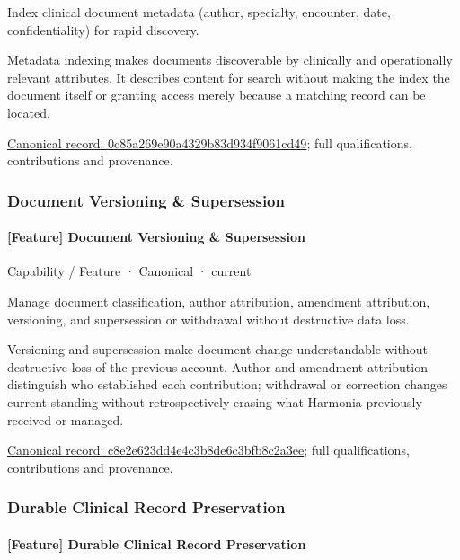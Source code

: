 Index clinical document metadata (author, specialty, encounter, date, confidentiality) for rapid discovery.



Metadata indexing makes documents discoverable by clinically and operationally relevant attributes. It describes content for search without making the index the document itself or granting access merely because a matching record can be located.


{\footnotesize \href{../../../../continuum/strategy/capability/feature/0c85a269e90a4329b83d934f9061cd49.md}{Canonical record: 0c85a269e90a4329b83d934f9061cd49}; full qualifications, contributions and provenance.}\par
\subsubsection{Document Versioning \& Supersession}

\paragraph{[Feature] Document Versioning \& Supersession}

\label{element:c8e2e623dd4e4c3b8de6c3bfb8c2a3ee}
{\small Capability / Feature · Canonical · current}\par

Manage document classification, author attribution, amendment attribution, versioning, and supersession or withdrawal without destructive data loss.



Versioning and supersession make document change understandable without destructive loss of the previous account. Author and amendment attribution distinguish who established each contribution; withdrawal or correction changes current standing without retrospectively erasing what Harmonia previously received or managed.


{\footnotesize \href{../../../../continuum/strategy/capability/feature/c8e2e623dd4e4c3b8de6c3bfb8c2a3ee.md}{Canonical record: c8e2e623dd4e4c3b8de6c3bfb8c2a3ee}; full qualifications, contributions and provenance.}\par
\subsubsection{Durable Clinical Record Preservation}

\paragraph{[Feature] Durable Clinical Record Preservation}

